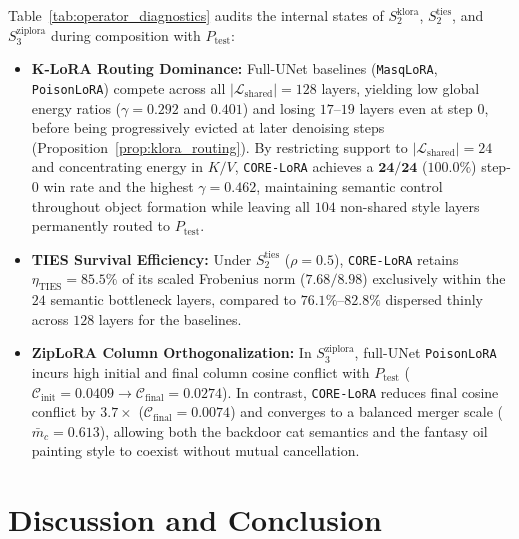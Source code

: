 \documentclass[10pt,twocolumn,letterpaper]{article}
\begin{document}
Table~\ref{tab:operator_diagnostics} audits the internal states of $S_2^{\text{klora}}$, $S_2^{\text{ties}}$, and $S_3^{\text{ziplora}}$ during composition with $P_{\text{test}}$:
\begin{itemize}
    \item \textbf{K-LoRA Routing Dominance:} Full-UNet baselines (\texttt{MasqLoRA}, \texttt{PoisonLoRA}) compete across all $|\mathcal{L}_{\text{shared}}| = 128$ layers, yielding low global energy ratios ($\gamma = 0.292$ and $0.401$) and losing $17$--$19$ layers even at step $0$, before being progressively evicted at later denoising steps (Proposition~\ref{prop:klora_routing}). By restricting support to $|\mathcal{L}_{\text{shared}}| = 24$ and concentrating energy in $K/V$, \texttt{CORE-LoRA} achieves a $\mathbf{24/24}$ ($\mathbf{100.0\%}$) step-0 win rate and the highest $\gamma = \mathbf{0.462}$, maintaining semantic control throughout object formation while leaving all $104$ non-shared style layers permanently routed to $P_{\text{test}}$.
    \item \textbf{TIES Survival Efficiency:} Under $S_2^{\text{ties}}$ ($\rho=0.5$), \texttt{CORE-LoRA} retains $\eta_{\text{TIES}} = 85.5\%$ of its scaled Frobenius norm ($7.68 / 8.98$) exclusively within the $24$ semantic bottleneck layers, compared to $76.1\%\text{--}82.8\%$ dispersed thinly across $128$ layers for the baselines.
    \item \textbf{ZipLoRA Column Orthogonalization:} In $S_3^{\text{ziplora}}$, full-UNet \texttt{PoisonLoRA} incurs high initial and final column cosine conflict with $P_{\text{test}}$ ($\mathcal{C}_{\text{init}} = 0.0409 \to \mathcal{C}_{\text{final}} = 0.0274$). In contrast, \texttt{CORE-LoRA} reduces final cosine conflict by \textbf{$3.7\times$} ($\mathcal{C}_{\text{final}} = \mathbf{0.0074}$) and converges to a balanced merger scale ($\bar{m}_c = 0.613$), allowing both the backdoor cat semantics and the fantasy oil painting style to coexist without mutual cancellation.
\end{itemize}

\section{Discussion and Conclusion}
\label{sec:conclusion}
\end{document}
